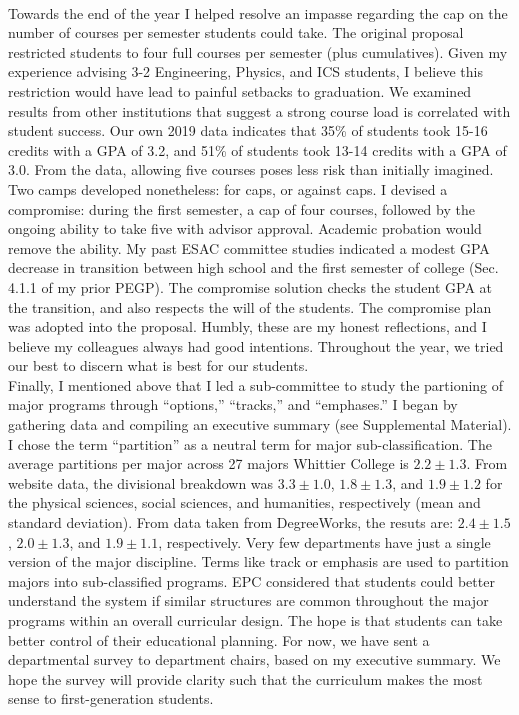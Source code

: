 \documentclass[../../../main.tex]{subfiles}
\begin{document}
\\
\vspace{0.25cm}
Towards the end of the year I helped resolve an impasse regarding the cap on the number of courses per semester students could take.  The original proposal restricted students to four full courses per semester (plus cumulatives).  Given my experience advising 3-2 Engineering, Physics, and ICS students, I believe this restriction would have lead to painful setbacks to graduation.  We examined results from other institutions that suggest a strong course load is correlated with student success.  Our own 2019 data indicates that 35\% of students took 15-16 credits with a GPA of 3.2, and 51\% of students took 13-14 credits with a GPA of 3.0.  From the data, allowing five courses poses less risk than initially imagined.  Two camps developed nonetheless: for caps, or against caps.  I devised a compromise: during the first semester, a cap of four courses, followed by the ongoing ability to take five with advisor approval.  Academic probation would remove the ability.  My past ESAC committee studies indicated a modest GPA decrease in transition between high school and the first semester of college (Sec. 4.1.1 of my prior PEGP).  The compromise solution checks the student GPA at the transition, and also respects the will of the students.  The compromise plan was adopted into the proposal.  Humbly, these are my honest reflections, and I believe my colleagues always had good intentions.  Throughout the year, we tried our best to discern what is best for our students.
\\
\vspace{0.25cm}
Finally, I mentioned above that I led a sub-committee to study the partioning of major programs through ``options,'' ``tracks,'' and ``emphases.''  I began by gathering data and compiling an executive summary (see Supplemental Material).  I chose the term ``partition'' as a neutral term for major sub-classification.  The average partitions per major across 27 majors Whittier College is $2.2 \pm 1.3$.  From website data, the divisional breakdown was $3.3 \pm 1.0$, $1.8 \pm 1.3$, and $1.9 \pm 1.2$ for the physical sciences, social sciences, and humanities, respectively (mean and standard deviation).  From data taken from DegreeWorks, the resuts are: $2.4 \pm 1.5$, $2.0 \pm 1.3$, and $1.9 \pm 1.1$, respectively.  Very few departments have just a single version of the major discipline.  Terms like track or emphasis are used to partition majors into sub-classified programs.  EPC considered that students could better understand the system if similar structures are common throughout the major programs within an overall curricular design.  The hope is that students can take better control of their educational planning.  For now, we have sent a departmental survey to department chairs, based on my executive summary.  We hope the survey will provide clarity such that the curriculum makes the most sense to first-generation students.
\end{document}
